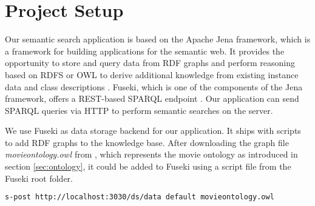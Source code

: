 \section{Project Setup}
Our semantic search application is based on the Apache Jena framework, which is a framework for building applications for the semantic web. %
It provides the opportunity to store \cite{jena:tdb} and query \cite{jena:arq} data from RDF graphs and perform reasoning based on RDFS or OWL to derive additional knowledge from existing instance data and class descriptions \cite{jena:inference, jena:ontology}. Fuseki, which is one of the components of the Jena framework, offers a REST-based SPARQL endpoint \cite{jena:fuseki}. Our application can send SPARQL queries via HTTP to perform semantic searches on the server.






We use Fuseki as data storage backend for our application. It ships with scripts to add RDF graphs to the knowledge base. After downloading the graph file \textit{movieontology.owl} from \cite{bouza:movieontology}, which represents the movie ontology as introduced in section \ref{sec:ontology}, it could be added to Fuseki using a script file from the Fuseki root folder.
\begin{lstlisting}[language=bash]
s-post http://localhost:3030/ds/data default movieontology.owl
\end{lstlisting}

